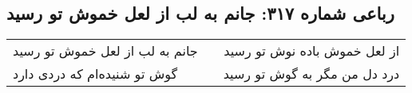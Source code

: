 \begin{center}
\section*{رباعی شماره ۳۱۷: جانم به لب از لعل خموش تو رسید}
\label{sec:sh317}
\begin{longtable}{l p{0.5cm} r}
جانم به لب از لعل خموش تو رسید
&&
از لعل خموش باده نوش تو رسید
\\
گوش تو شنیده‌ام که دردی دارد
&&
درد دل من مگر به گوش تو رسید
\\
\end{longtable}
\end{center}
